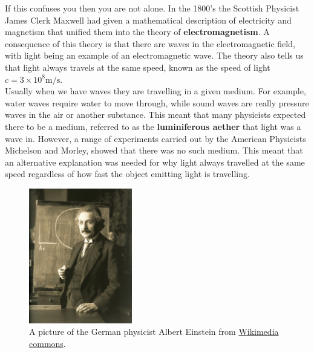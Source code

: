 \documentclass[a4paper,12pt]{book}
\begin{document}
If this confuses you then you are not alone. In the 1800's the Scottish Physicist James Clerk Maxwell had given a mathematical description of electricity and magnetism that unified them into the theory of \textbf{electromagnetism}. A consequence of this theory is that there are waves in the electromagnetic field, with light being an example of an electromagnetic wave. The theory also tells us that light always travels at the same speed, known as the speed of light $c=3\times 10^{8}\text{m/s}$.\\

Usually when we have waves they are travelling in a given medium. For example, water waves require water to move through, while sound waves are really pressure waves in the air or another substance.  This meant that many physicists expected there to be a medium, referred to as the \textbf{luminiferous aether} that light was a wave in. However, a range of experiments carried out by the American Physicists Michelson and Morley, showed that there was no such medium. This meant that an alternative explanation was needed for why light always travelled at the same speed regardless of how fast the object emitting light is travelling.\\

\begin{figure}[ht]
    \centering
    \includegraphics[width=0.4\textwidth]{figures/Einstein_1921_by_F_Schmutzer_-_restoration.jpg}
    \caption{A picture of the German physicist Albert Einstein from \href{https://upload.wikimedia.org/wikipedia/commons/3/3e/Einstein_1921_by_F_Schmutzer_-_restoration.jpg}{Wikimedia commons}.}
\end{figure}
\end{document}
